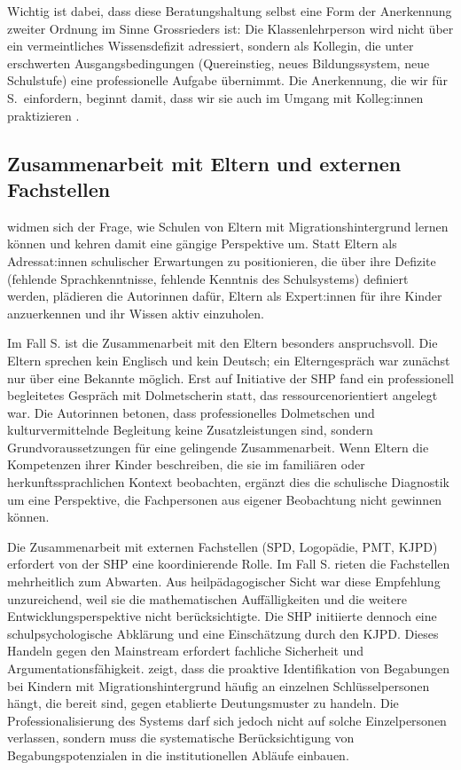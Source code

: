 \documentclass[ngerman, a4paper]{article}
\begin{document}
Wichtig ist dabei, dass diese Beratungshaltung selbst eine Form der
Anerkennung zweiter Ordnung im Sinne Grossrieders ist: Die
Klassenlehrperson wird nicht über ein vermeintliches Wissensdefizit
adressiert, sondern als Kollegin, die unter erschwerten
Ausgangsbedingungen (Quereinstieg, neues Bildungssystem, neue Schulstufe)
eine professionelle Aufgabe übernimmt. Die Anerkennung, die wir für S.\
einfordern, beginnt damit, dass wir sie auch im Umgang mit Kolleg:innen
praktizieren \parencite[S.\,90\psq]{grossrieder2010anerkennung}.

\subsection{Zusammenarbeit mit Eltern und externen Fachstellen}

\textcite{kosoroklabhart2021voneltern} widmen sich der Frage, wie Schulen
von Eltern mit Migrationshintergrund lernen können und kehren damit eine gängige
Perspektive um. Statt Eltern als Adressat:innen schulischer Erwartungen zu
positionieren, die über ihre Defizite (fehlende Sprachkenntnisse, fehlende
Kenntnis des Schulsystems) definiert werden, plädieren die Autorinnen dafür, Eltern
als Expert:innen für ihre Kinder anzuerkennen und ihr Wissen aktiv einzuholen.

Im Fall S. ist die Zusammenarbeit mit den Eltern besonders anspruchsvoll. Die Eltern
sprechen kein Englisch und kein Deutsch; ein Elterngespräch war zunächst nur über
eine Bekannte möglich. Erst auf Initiative der SHP fand ein professionell
begleitetes Gespräch mit Dolmetscherin statt, das ressourcenorientiert angelegt war.
Die Autorinnen betonen, dass professionelles Dolmetschen und
kulturvermittelnde Begleitung keine Zusatzleistungen sind, sondern Grundvoraussetzungen
für eine gelingende Zusammenarbeit. Wenn Eltern die Kompetenzen ihrer Kinder
beschreiben, die sie im familiären oder herkunftssprachlichen Kontext beobachten,
ergänzt dies die schulische Diagnostik um eine Perspektive, die Fachpersonen aus
eigener Beobachtung nicht gewinnen können.

Die Zusammenarbeit mit externen Fachstellen (SPD, Logopädie, PMT, KJPD)
erfordert von der SHP eine koordinierende Rolle. Im Fall S. rieten die
Fachstellen mehrheitlich zum Abwarten. Aus heilpädagogischer Sicht war diese
Empfehlung unzureichend, weil sie die mathematischen Auffälligkeiten und die
weitere Entwicklungsperspektive nicht berücksichtigte. Die SHP initiierte
dennoch eine schulpsychologische Abklärung und eine Einschätzung durch den KJPD.
Dieses Handeln gegen den Mainstream erfordert fachliche Sicherheit und
Argumentationsfähigkeit. \textcite[S.\,185--194]{leikhof2021jugendliche} zeigt, dass die proaktive Identifikation von
Begabungen bei Kindern mit Migrationshintergrund häufig an einzelnen
Schlüsselpersonen hängt, die bereit sind, gegen etablierte Deutungsmuster zu
handeln. Die Professionalisierung des Systems darf sich jedoch nicht auf solche
Einzelpersonen verlassen, sondern muss die systematische Berücksichtigung
von Begabungspotenzialen in die institutionellen Abläufe einbauen.
\end{document}

